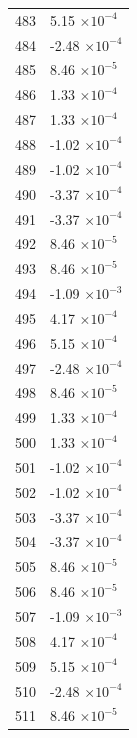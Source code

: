 \documentclass[a4paper,11pt]{article}
\begin{document}
\begin{center}
\begin{longtable}{|R{1.5cm}|R{2.5cm}|}
  483 &         5.15 $\times 10^{          -4}$ \\
  484 &        -2.48 $\times 10^{          -4}$ \\
  485 &         8.46 $\times 10^{          -5}$ \\
  486 &         1.33 $\times 10^{          -4}$ \\
  487 &         1.33 $\times 10^{          -4}$ \\
  488 &        -1.02 $\times 10^{          -4}$ \\
  489 &        -1.02 $\times 10^{          -4}$ \\
  490 &        -3.37 $\times 10^{          -4}$ \\
  491 &        -3.37 $\times 10^{          -4}$ \\
  492 &         8.46 $\times 10^{          -5}$ \\
  493 &         8.46 $\times 10^{          -5}$ \\
  494 &        -1.09 $\times 10^{          -3}$ \\
  495 &         4.17 $\times 10^{          -4}$ \\
  496 &         5.15 $\times 10^{          -4}$ \\
  497 &        -2.48 $\times 10^{          -4}$ \\
  498 &         8.46 $\times 10^{          -5}$ \\
  499 &         1.33 $\times 10^{          -4}$ \\
  500 &         1.33 $\times 10^{          -4}$ \\
  501 &        -1.02 $\times 10^{          -4}$ \\
  502 &        -1.02 $\times 10^{          -4}$ \\
  503 &        -3.37 $\times 10^{          -4}$ \\
  504 &        -3.37 $\times 10^{          -4}$ \\
  505 &         8.46 $\times 10^{          -5}$ \\
  506 &         8.46 $\times 10^{          -5}$ \\
  507 &        -1.09 $\times 10^{          -3}$ \\
  508 &         4.17 $\times 10^{          -4}$ \\
  509 &         5.15 $\times 10^{          -4}$ \\
  510 &        -2.48 $\times 10^{          -4}$ \\
  511 &         8.46 $\times 10^{          -5}$ \\

\end{longtable}
\end{center}
\end{document}
